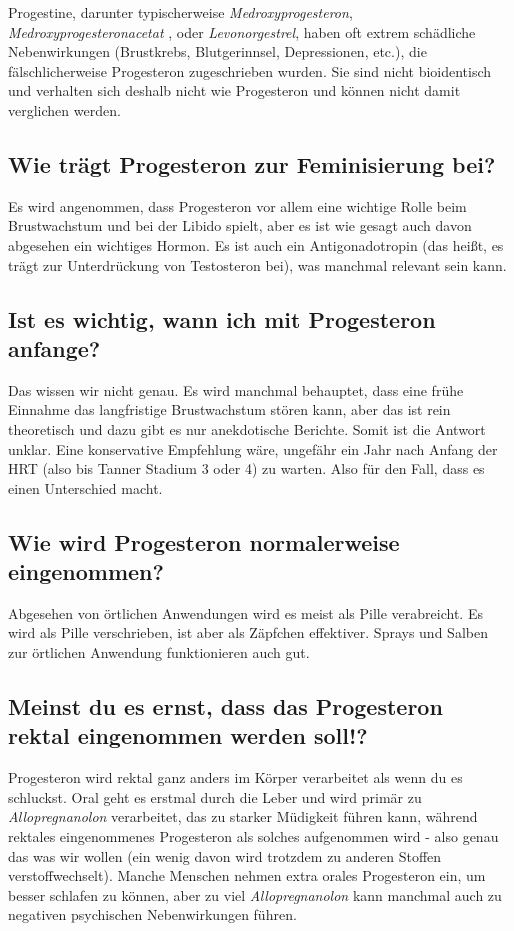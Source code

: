 \documentclass{article}
\begin{document}
Progestine, darunter typischerweise \textit{Medroxyprogesteron}, \textit{Medroxyprogesteronacetat }, oder \textit{Levonorgestrel}, haben oft extrem schädliche Nebenwirkungen (Brustkrebs, Blutgerinnsel, Depressionen, etc.), die fälschlicherweise Progesteron zugeschrieben wurden. Sie sind nicht bioidentisch und verhalten sich deshalb nicht wie Progesteron und können nicht damit verglichen werden.

\subsection{Wie trägt Progesteron zur Feminisierung bei?}

Es wird angenommen, dass Progesteron vor allem eine wichtige Rolle beim Brustwachstum und bei der Libido spielt, aber es ist wie gesagt auch davon abgesehen ein wichtiges Hormon. Es ist auch ein Antigonadotropin (das heißt, es trägt zur Unterdrückung von Testosteron bei), was manchmal relevant sein kann.

\subsection{Ist es wichtig, wann ich mit Progesteron anfange?}

Das wissen wir nicht genau. Es wird manchmal behauptet, dass eine frühe Einnahme das langfristige Brustwachstum stören kann, aber das ist rein theoretisch und dazu gibt es nur anekdotische Berichte. Somit ist die Antwort unklar. Eine konservative Empfehlung wäre, ungefähr ein Jahr nach Anfang der HRT (also bis Tanner Stadium 3 oder 4) zu warten. Also für den Fall, dass es einen Unterschied macht.

\subsection{Wie wird Progesteron normalerweise eingenommen?}

Abgesehen von örtlichen Anwendungen wird es meist als Pille verabreicht. Es wird als Pille verschrieben, ist aber als Zäpfchen effektiver. Sprays und Salben zur örtlichen Anwendung funktionieren auch gut.

\subsection{Meinst du es ernst, dass das Progesteron rektal eingenommen werden soll!?}

Progesteron wird rektal ganz anders im Körper verarbeitet als wenn du es schluckst. Oral geht es erstmal durch die Leber und wird primär zu \textit{Allopregnanolon} verarbeitet, das zu starker Müdigkeit führen kann, während rektales eingenommenes Progesteron als solches aufgenommen wird - also genau das was wir wollen (ein wenig davon wird trotzdem zu anderen Stoffen verstoffwechselt). Manche Menschen nehmen extra orales Progesteron ein, um besser schlafen zu können, aber zu viel \textit{Allopregnanolon }kann manchmal auch zu negativen psychischen Nebenwirkungen führen.
\end{document}
